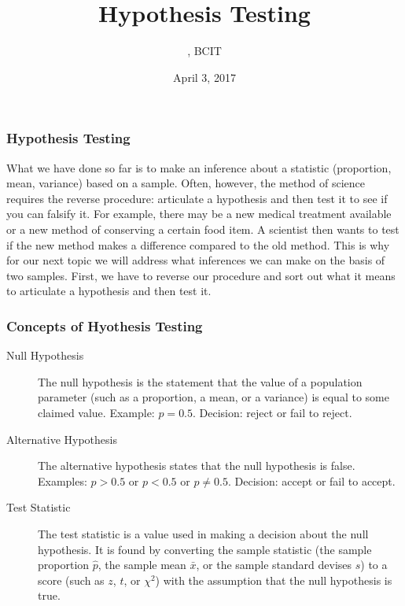 \documentclass[xcolor=dvipsnames]{beamer}
\title{Hypothesis Testing}
\subtitle{{\CourseNumber}, BCIT}
\author{\CourseName}
\date{April 3, 2017}
\begin{document}
\begin{frame}
  \titlepage
\end{frame}

\begin{frame}
  \frametitle{Hypothesis Testing}
  What we have done so far is to make an inference about a statistic
  (proportion, mean, variance) based on a sample. Often, however,
  the method of science requires the reverse procedure: articulate a
  hypothesis and then test it to see if you can falsify it. For
  example, there may be a new medical treatment available or a new
  method of conserving a certain food item. A scientist then wants to
  test if the new method makes a difference compared to the old
  method. This is why for our next topic we will address what
  inferences we can make on the basis of two samples. First, we have
  to reverse our procedure and sort out what it means to articulate a
  hypothesis and then test it.
\end{frame}

\begin{frame}
  \frametitle{Concepts of Hyothesis Testing}
  \begin{description}
  \item[Null Hypothesis] The null hypothesis is the statement that the
    value of a population parameter (such as a proportion, a mean, or
    a variance) is equal to some claimed value. Example: $p=0.5$.
    Decision: \alert{reject} or \alert{fail to reject}.
  \item[Alternative Hypothesis] The alternative hypothesis states that
    the null hypothesis is false. Examples: $p>0.5$ or $p<0.5$ or
    $p\neq{}0.5$. Decision: \alert{accept} or
    \alert{fail to accept}.
  \item[Test Statistic] The test statistic is a value used in making a
    decision about the null hypothesis. It is found by converting the
    sample statistic (the sample proportion $\hat{p}$, the sample mean
    $\bar{x}$, or the sample standard devises $s$) to a score (such as
    $z$, $t$, or $\chi^{2}$) with the assumption that the null
    hypothesis is true.
  \end{description}
\end{frame}
\end{document}
